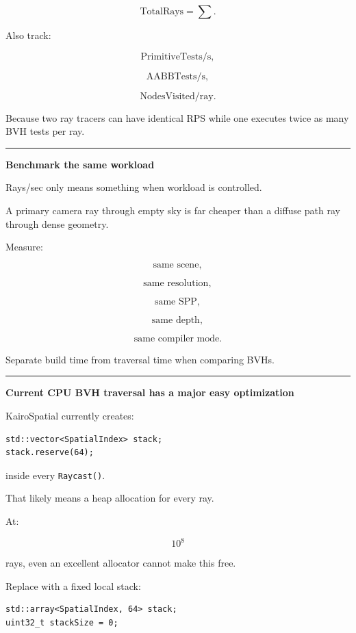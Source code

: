 \[
\text{TotalRays}
=
\sum.
\]

Also track:

\[
\text{PrimitiveTests/s},
\]

\[
\text{AABBTests/s},
\]

\[
\text{NodesVisited/ray}.
\]

Because two ray tracers can have identical RPS while one executes twice as many BVH tests per ray.

\begin{center}\rule{0.5\linewidth}{0.5pt}\end{center}

\textbf{Benchmark the same workload}

Rays/sec only means something when workload is controlled.

A primary camera ray through empty sky is far cheaper than a diffuse path ray through dense geometry.

Measure:

\[
\text{same scene},
\]

\[
\text{same resolution},
\]

\[
\text{same SPP},
\]

\[
\text{same depth},
\]

\[
\text{same compiler mode}.
\]

Separate build time from traversal time when comparing BVHs.

\begin{center}\rule{0.5\linewidth}{0.5pt}\end{center}

\textbf{Current CPU BVH traversal has a major easy optimization}

KairoSpatial currently creates:

\begin{verbatim}
std::vector<SpatialIndex> stack;
stack.reserve(64);
\end{verbatim}

inside every \texttt{Raycast()}.

That likely means a heap allocation for every ray.

At:

\[
10^8
\]

rays, even an excellent allocator cannot make this free.

Replace with a fixed local stack:

\begin{verbatim}
std::array<SpatialIndex, 64> stack;
uint32_t stackSize = 0;
\end{verbatim}

